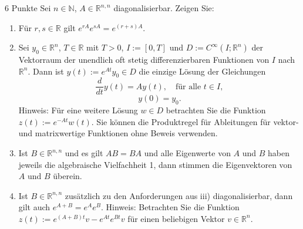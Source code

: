 \documentclass{problemset}
\author{Michael van Straten}
\begin{document}
\maketitle

\begin{problem}{6 Punkte}
Sei $n \in \mathbb{N}$, $A \in \mathbb{R}^{n,n}$ diagonalisierbar. Zeigen Sie:
\begin{enumerate}
    \item Für $r, s \in \mathbb{R}$ gilt $e^{rA}e^{sA} = e^{(r+s)A}$.
    \item Sei $y_0 \in \mathbb{R}^n$, $T \in \mathbb{R}$ mit $T > 0$, $I := [0,
              T]$ und $D := C^\infty(I; \mathbb{R}^n)$ der Vektorraum der unendlich
          oft stetig differenzierbaren Funktionen von $I$ nach $\mathbb{R}^n$.
          Dann ist $y(t) := e^{At}y_0 \in D$ die einzige Lösung der Gleichungen
          \[ \frac{d}{dt} y(t) = Ay(t), \quad \text{für alle } t \in I, \]
          \[ y(0) = y_0. \]
          Hinweis: Für eine weitere Lösung $w \in D$ betrachten Sie die
          Funktion $z(t) := e^{-At}w(t)$. Sie können die Produktregel für
          Ableitungen für vektor- und matrixwertige Funktionen ohne Beweis
          verwenden.
    \item Ist $B \in \mathbb{R}^{n,n}$ und es gilt $AB = BA$ und alle
          Eigenwerte von $A$ und $B$ haben jeweils die algebraische
          Vielfachheit 1, dann stimmen die Eigenvektoren von $A$ und $B$
          überein.
    \item Ist $B \in \mathbb{R}^{n,n}$ zusätzlich zu den Anforderungen aus iii)
          diagonalisierbar, dann gilt auch $e^{A+B} = e^Ae^B$. Hinweis:
          Betrachten Sie die Funktion $z(t) := e^{(A+B)t}v - e^{At}e^{Bt}v$ für
          einen beliebigen Vektor $v \in \mathbb{R}^n$.
\end{enumerate}
\end{problem}
\end{document}
